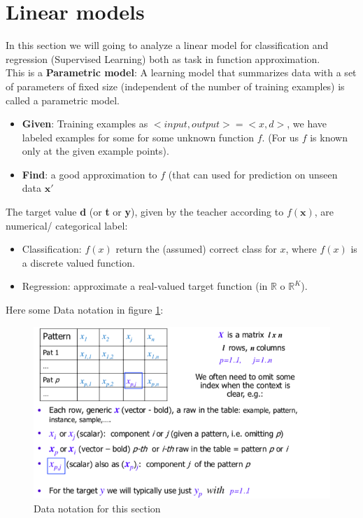 \documentclass[../main.tex]{subfiles}
\begin{document}
\section{Linear models}
In this section we will going to analyze a linear model for classification and regression (Supervised Learning) both as task in function approximation. \\

This is a \textbf{Parametric model}: A learning model that summarizes data with a set of parameters of fixed size (independent of the number of training examples) is called a parametric model.
\begin{itemize}
    \item \textbf{Given}: Training examples as $<input,output>=<x,d>$, we have labeled examples for some for some unknown function $f$. (For us $f$ is known only at the given example points).
    
    \item \textbf{Find}: a good approximation to $f$ (that can used for prediction on unseen data $\mathbf{x}'$
\end{itemize}

The target value \textbf{d} (or \textbf{t} or \textbf{y}), given by the teacher according to $f(\textbf{x})$, are numerical/ categorical label:
\begin{itemize}
    \item Classification: $f(x)$ return the (assumed) correct class for $x$, where $f(x)$ is a discrete valued function.
    
    \item Regression:  approximate a real-valued target function (in $\mathbb{R}$ o $\mathbb{R}^K$).
\end{itemize}

Here some Data notation in figure \ref{fig:data_notation}:
\begin{figure}[H]
    \centering
    \includegraphics[scale = 0.4]{lectures/2_linear_model/data_notation.png}
    \caption{Data notation for this section}
    \label{fig:data_notation}
\end{figure}
\end{document}
